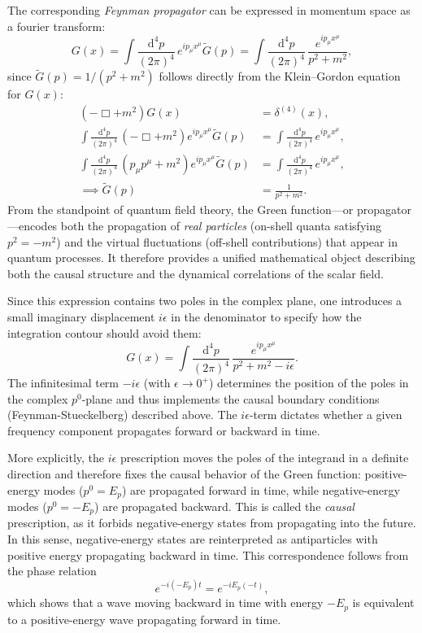 The corresponding \textit{Feynman propagator} can be expressed in momentum space as a fourier transform:
\begin{equation}
    G(x) = \int \frac{\mathrm{d}^4 p}{(2\pi)^4} \, e^{i p_{\mu} x^{\mu}} \tilde{G}(p)
    = \int \frac{\mathrm{d}^4 p}{(2\pi)^4} \, \frac{e^{i p_{\mu} x^{\mu}}}{p^2 + m^2},
\end{equation}
since \(\tilde{G}(p) = 1/(p^2 + m^2)\) follows directly from the Klein--Gordon equation for \(G(x)\):
\[
    \begin{aligned}
        (-\Box + m^2) G(x)                                                                               & = \delta^{(4)}(x),                                               \\
        \int \frac{\mathrm{d}^4 p}{(2\pi)^4} \, (-\Box + m^2) e^{i p_{\mu} x^{\mu}} \tilde{G}(p)         & = \int \frac{\mathrm{d}^4 p}{(2\pi)^4} \, e^{i p_{\mu} x^{\mu}}, \\
        \int \frac{\mathrm{d}^4 p}{(2\pi)^4} \, (p_\mu p^{\mu} + m^2) e^{i p_{\mu} x^{\mu}} \tilde{G}(p) & = \int \frac{\mathrm{d}^4 p}{(2\pi)^4} \, e^{i p_{\mu} x^{\mu}}, \\
        \implies \tilde{G}(p)                                                                            & = \frac{1}{p^2 + m^2}.
    \end{aligned}
\]
From the standpoint of quantum field theory, the Green function---or propagator---encodes both the propagation of \textit{real particles} (on-shell quanta satisfying \(p^2 = -m^2\)) and the virtual fluctuations (off-shell contributions) that appear in quantum processes.
It therefore provides a unified mathematical object describing both the causal structure and the dynamical correlations of the scalar field.

Since this expression contains two poles in the complex plane, one introduces a small imaginary displacement \(i\epsilon\) in the denominator to specify how the integration contour should avoid them:
\[
    G(x) = \int \frac{\mathrm{d}^4 p}{(2\pi)^4} \, \frac{e^{i p_{\mu} x^{\mu}}}{p^2 + m^2 - i\epsilon}.
\]
The infinitesimal term \(-i\epsilon\) (with \(\epsilon \to 0^+\)) determines the position of the poles in the complex \(p^0\)-plane and thus implements the causal boundary conditions (Feynman-Stueckelberg) described above.
The \(i\epsilon\)-term dictates whether a given frequency component propagates forward or backward in time.

More explicitly, the $i\epsilon$ prescription moves the poles of the integrand in a definite direction and therefore fixes the causal behavior of the Green function: positive-energy modes (\(p^0 = E_p\)) are propagated forward in time, while negative-energy modes (\(p^0 = -E_p\)) are propagated backward.
This is called the \textit{causal} prescription, as it forbids negative-energy states from propagating into the future.
In this sense, negative-energy states are reinterpreted as antiparticles with positive energy propagating backward in time.
This correspondence follows from the phase relation
\[
    e^{-i(-E_p)t} = e^{-iE_p(-t)},
\]
which shows that a wave moving backward in time with energy \(-E_p\) is equivalent to a positive-energy wave propagating forward in time.

